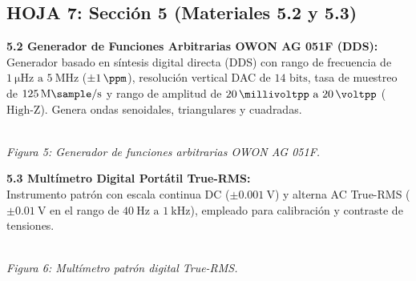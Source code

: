 \documentclass[a4paper, 11pt]{article}
\begin{document}
\subsection*{\color{uni-blue} HOJA 7: Sección 5 (Materiales 5.2 y 5.3)}
\begin{tcolorbox}[title=Texto a Escribir: Material 5.2 (Generador OWON), colframe=black]
    \small
    \textbf{5.2 Generador de Funciones Arbitrarias OWON AG 051F (DDS):}\\[0.15cm]
    Generador basado en síntesis digital directa (DDS) con rango de frecuencia de $\qty{1}{\micro\hertz}\text{ a }\qty{5}{\mega\hertz}$ ($\pm\qty{1}{\ppm}$), resolución vertical DAC de $14\text{ bits}$, tasa de muestreo de $\qty{125}{\mega\sample\per\second}$ y rango de amplitud de $\qty{20}{\millivoltpp}\text{ a }\qty{20}{\voltpp}$ ($\text{High-Z}$). Genera ondas senoidales, triangulares y cuadradas.\\[0.2cm]
    \begin{center}
        \\[0.1cm]
        {\scriptsize\textit{Figura 5: Generador de funciones arbitrarias OWON AG 051F.}}
    \end{center}
\end{tcolorbox}

\vspace{0.2cm}

\begin{tcolorbox}[title=Texto a Escribir: Material 5.3 (Multímetro Digital), colframe=black]
    \small
    \textbf{5.3 Multímetro Digital Portátil True-RMS:}\\[0.15cm]
    Instrumento patrón con escala continua DC ($\pm\qty{0,001}{\volt}$) y alterna AC True-RMS ($\pm\qty{0,01}{\volt}$ en el rango de $\qty{40}{\hertz}\text{ a }\qty{1}{\kilo\hertz}$), empleado para calibración y contraste de tensiones.\\[0.2cm]
    \begin{center}
        \\[0.1cm]
        {\scriptsize\textit{Figura 6: Multímetro patrón digital True-RMS.}}
    \end{center}
\end{tcolorbox}
\end{document}
